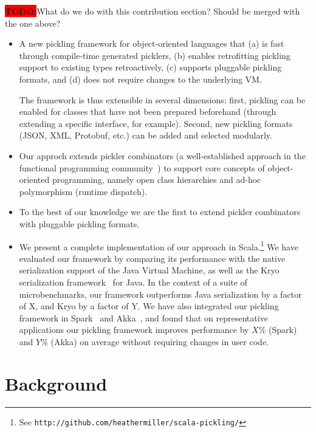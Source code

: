 \documentclass[preprint,10pt]{sigplanconf}
\theoremstyle{definition}
\newcommand{\todo}{{\bf \colorbox{red}{\color{white}TODO:}}}
\begin{document}
\todo What do we do with this contribution section? Should be merged with the one above?

\begin{itemize}

\item A new pickling framework for object-oriented languages that (a)
  is fast through compile-time generated picklers, (b) enables
  retrofitting pickling support to existing types retroactively, (c)
  supports pluggable pickling formats, and (d) does not require
  changes to the underlying VM.

  The framework is thus extensible in several dimensions: first,
  pickling can be enabled for classes that have not been prepared
  beforehand (through extending a specific interface, for
  example). Second, new pickling formats (JSON, XML, Protobuf, etc.)
  can be added and selected modularly.

\item Our approch extends pickler combinators (a well-established
  approach in the functional programming
  community~\cite{Kennedy,Elsman}) to support core concepts of
  object-oriented programming, namely open class hierarchies and
  ad-hoc polymorphism (runtime dispatch).

\item To the best of our knowledge we are the first to extend pickler
  combinators with pluggable pickling formats.

\item We present a complete implementation of our approach in
  Scala.\footnote{See
    \texttt{http://github.com/heathermiller/scala-pickling/}} We have
  evaluated our framework by comparing its performance with the native
  serialization support of the Java Virtual Machine, as well as the
  Kryo serialization framework~\cite{Kryo} for Java. In the context of
  a suite of microbenchmarks, our framework outperforms Java
  serialization by a factor of X, and Kryo by a factor of Y. We have
  also integrated our pickling framework in Spark~\cite{Zaharia2010}
  and Akka~\cite{Akka}, and found that on representative applications
  our pickling framework improves performance by $X \%$ (Spark) and $Y
  \%$ (Akka) on average without requiring changes in user code.

\end{itemize}


\section{Background}
\end{document}
